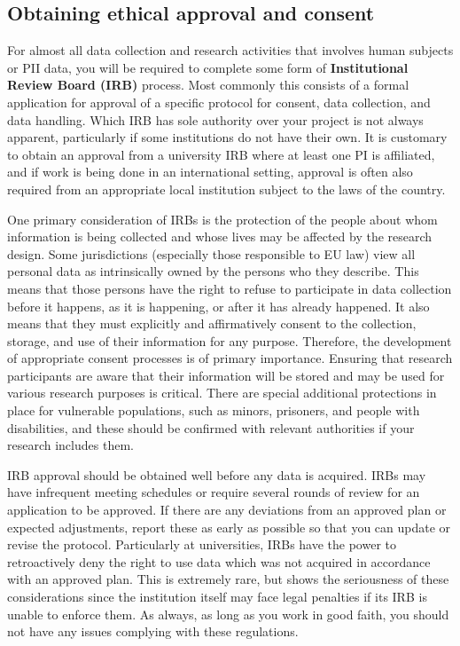 \subsection{Obtaining ethical approval and consent}

For almost all data collection and research activities that involves
human subjects or PII data,
you will be required to complete some form of \textbf{Institutional Review Board (IRB)} process.
Most commonly this consists of a formal application for approval of a specific
protocol for consent, data collection, and data handling.
Which IRB has sole authority over your project is not always apparent,
particularly if some institutions do not have their own.
It is customary to obtain an approval from a university IRB
where at least one PI is affiliated,
and if work is being done in an international setting,
approval is often also required
from an appropriate local institution subject to the laws of the country.

One primary consideration of IRBs
is the protection of the people about whom information is being collected
and whose lives may be affected by the research design.
Some jurisdictions (especially those responsible to EU law) view all personal data
as intrinsically owned by the persons who they describe.
This means that those persons have the right to refuse to participate in data collection
before it happens, as it is happening, or after it has already happened.
It also means that they must explicitly and affirmatively consent
to the collection, storage, and use of their information for any purpose.
Therefore, the development of appropriate consent processes is of primary importance.
Ensuring that research participants are aware that their information
will be stored and may be used for various research purposes is critical.
There are special additional protections in place for vulnerable populations,
such as minors, prisoners, and people with disabilities,
and these should be confirmed with relevant authorities if your research includes them.

IRB approval should be obtained well before any data is acquired. 
IRBs may have infrequent meeting schedules
or require several rounds of review for an application to be approved.
If there are any deviations from an approved plan or expected adjustments,
report these as early as possible so that you can update or revise the protocol.
Particularly at universities, IRBs have the power to retroactively deny
the right to use data which was not acquired in accordance with an approved plan.
This is extremely rare, but shows the seriousness of these considerations
since the institution itself may face legal penalties if its IRB
is unable to enforce them. As always, as long as you work in good faith,
you should not have any issues complying with these regulations.

